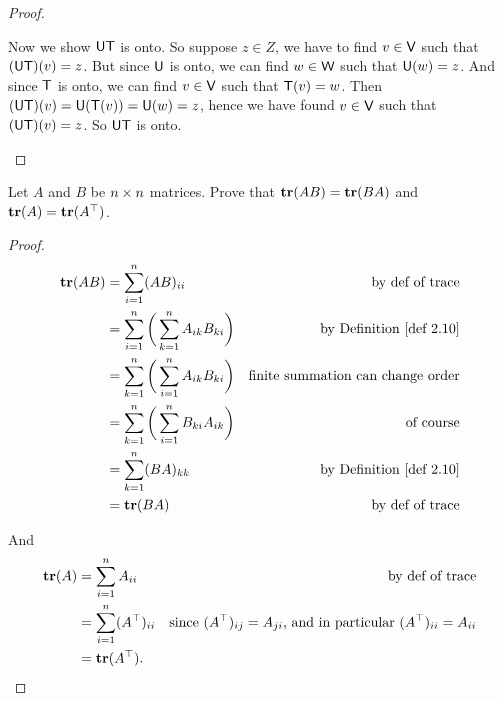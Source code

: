 \begin{proof}
\begin{enumerate}
Now we show \(\textsf{U}\textsf{T}\) is onto.
So suppose \(z \in Z\), we have to find \(v \in \textsf{V}\) such that \((\textsf{U}\textsf{T})(v) = z\).
But since \(\textsf{U}\) is onto, we can find \(w \in \textsf{W}\) such that \(\textsf{U}(w) = z\).
And since \(\textsf{T}\) is onto, we can find \(v \in \textsf{V}\) such that \(\textsf{T}(v) = w\).
Then \((\textsf{U}\textsf{T})(v) = \textsf{U}(\textsf{T}(v)) = \textsf{U}(w) = z\),
hence we have found \(v \in \textsf{V}\) such that \((\textsf{U}\textsf{T})(v) = z\).
So \(\textsf{U}\textsf{T}\) is onto.
\end{enumerate}
\end{proof}

\begin{exercise} \label{exercise 2.3.13}
Let \(A\) and \(B\) be \(n \times n\) matrices.
Prove that \(\textbf{tr}(AB) = \textbf{tr}(BA)\) and \(\textbf{tr}(A) = \textbf{tr}(A^\top)\).
\end{exercise}

\begin{proof}
\begin{align*}
    \TRACE(AB) & = \sum_{i = 1}^n (AB)_{ii} & \text{by def of trace} \\
               & = \sum_{i = 1}^n \bigg( \sum_{k = 1}^n A_{ik} B_{ki} \bigg) & \text{by \DEF{2.10}} \\
               & = \sum_{k = 1}^n \bigg( \sum_{i = 1}^n A_{ik} B_{ki} \bigg) & \text{finite summation can change order} \\
               & = \sum_{k = 1}^n \bigg( \sum_{i = 1}^n B_{ki} A_{ik} \bigg) & \text{of course} \\
               & = \sum_{k = 1}^n (BA)_{kk} & \text{by \DEF{2.10}} \\
               & = \TRACE(BA) & \text{by def of trace}
\end{align*}

And
\begin{align*}
    \textbf{tr}(A) & = \sum_{i = 1}^n A_{ii} & \text{by def of trace} \\
              & = \sum_{i = 1}^n (A^\top)_{ii} & \text{since \((A^\top)_{ij} = A_{ji}\), and in particular \((A^\top)_{ii} = A_{ii}\)} \\
              & = \textbf{tr}(A^\top).
\end{align*}
\end{proof}

